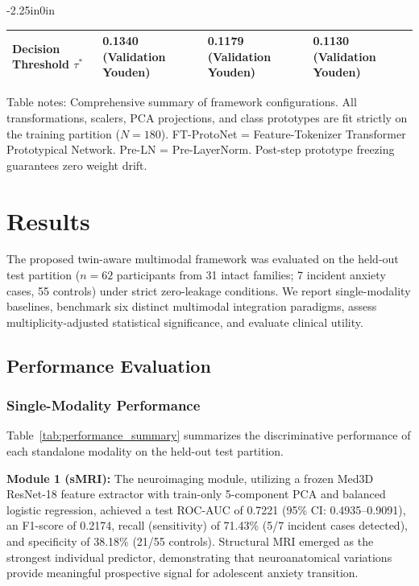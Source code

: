 \documentclass[10pt,letterpaper]{article}
\begin{document}
\begin{table}[!t]
\begin{adjustwidth}{-2.25in}{0in}
\begin{tabular}{|p{3.8cm}|p{3.5cm}|p{3.5cm}|p{3.5cm}|}
\hline
Decision Threshold $\tau^*$ & 0.1340 (Validation Youden) & 0.1179 (Validation Youden) & 0.1130 (Validation Youden) \\
\hline
\end{tabular}
\begin{flushleft}
Table notes: Comprehensive summary of framework configurations. All transformations, scalers, PCA projections, and class prototypes are fit strictly on the training partition ($N=180$). FT-ProtoNet = Feature-Tokenizer Transformer Prototypical Network. Pre-LN = Pre-LayerNorm. Post-step prototype freezing guarantees zero weight drift.
\end{flushleft}
\end{adjustwidth}
\end{table}

\section*{Results}

The proposed twin-aware multimodal framework was evaluated on the held-out test partition ($n=62$ participants from 31 intact families; 7 incident anxiety cases, 55 controls) under strict zero-leakage conditions. We report single-modality baselines, benchmark six distinct multimodal integration paradigms, assess multiplicity-adjusted statistical significance, and evaluate clinical utility.

\subsection*{Performance Evaluation}
\subsubsection*{Single-Modality Performance}
Table~\ref{tab:performance_summary} summarizes the discriminative performance of each standalone modality on the held-out test partition.

\textbf{Module 1 (sMRI):} The neuroimaging module, utilizing a frozen Med3D ResNet-18 feature extractor with train-only 5-component PCA and balanced logistic regression, achieved a test ROC-AUC of 0.7221 (95\% CI: 0.4935--0.9091), an F1-score of 0.2174, recall (sensitivity) of 71.43\% (5/7 incident cases detected), and specificity of 38.18\% (21/55 controls). Structural MRI emerged as the strongest individual predictor, demonstrating that neuroanatomical variations provide meaningful prospective signal for adolescent anxiety transition.
\end{document}
